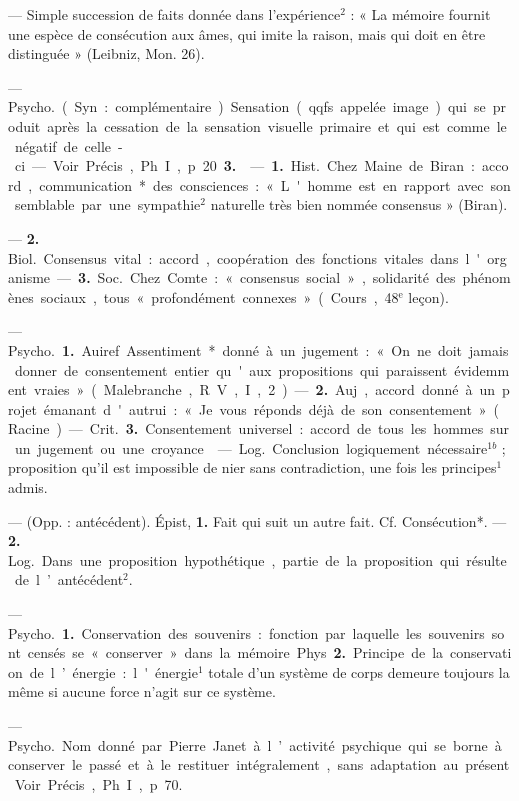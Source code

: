 \begin{itemize}[leftmargin=1cm, label=, itemsep=11pt]
 — Simple succession de
faits donnée dans l'expérience$^2$ :
« La mémoire fournit une espèce de
consécution aux âmes, qui imite la
raison, mais qui doit en être distinguée » (Leibniz, Mon. 26).

 — \si{Psycho.}
(Syn. : complémentaire) Sensation
(qqfs appelée image) qui se produit
après la cessation de la sensation
visuelle primaire et qui est comme
le négatif de celle-ci. — Voir Précis,
Ph. I, p. 20 {\bf 3.}

 — {\bf 1.} \si{Hist.} Chez Maine de
Biran : accord, communication*
des consciences : « L'homme est en
rapport avec son semblable par une
sympathie$^2$ naturelle très bien
nommée consensus » (Biran).

—  {\bf 2.} \si{Biol.} Consensus vital : accord, coopération des fonctions vitales dans l'organisme.

— {\bf 3.} \si{Soc.} Chez Comte : « consensus
social », solidarité des phénomènes
sociaux, tous « profondément connexes » (Cours, 48$^\text{e}$ leçon).

 — \si{Psycho.} {\bf 1.} Auiref.
Assentiment* donné à un jugement : « On ne doit jamais donner de
consentement entier qu'aux propositions qui paraissent évidemment
vraies » (Malebranche, R. V., I, 2). —
 {\bf 2.} Auj., accord donné à un projet
émanant d'autrui : « Je vous réponds
déjà de son consentement » (Racine).

— \si{Crit.}  {\bf 3.} Consentement universel : accord de tous les hommes
sur un jugement ou une croyance.

 — \si{Log.} Conclusion logiquement nécessaire$^{1b}$ ; proposition
qu’il est impossible de nier sans
contradiction, une fois les principes$^1$
admis.

 — (Opp. : antécédent).
Épist, {\bf 1.} Fait qui suit un autre fait.
Cf. Consécution*. —  {\bf 2.} \si{Log.} Dans
une proposition hypothétique, partie
de la proposition qui résulte de
l’antécédent$^2$.

 — \si{Psycho.} {\bf 1.} Conservation des souvenirs : fonction par
laquelle les souvenirs sont censés se
« conserver » dans la mémoire.

Phys.  {\bf 2.} Principe de la conservation de l’énergie : l'énergie$^1$ totale
d’un système de corps demeure toujours la même si aucune force n’agit
sur ce système.

 — \si{Psycho.}
Nom donné par Pierre Janet à l’activité psychique qui se borne à conserver le passé et à le restituer intégralement, sans adaptation au présent. Voir Précis, Ph. I, p. 70.


\end{itemize}
